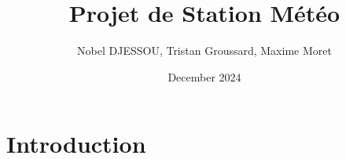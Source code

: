 \documentclass{article}
\title{Projet de Station Météo}
\author{Nobel DJESSOU, Tristan Groussard, Maxime Moret}
\date{December 2024}
\begin{document}
\maketitle

\section{Introduction}
\end{document}
